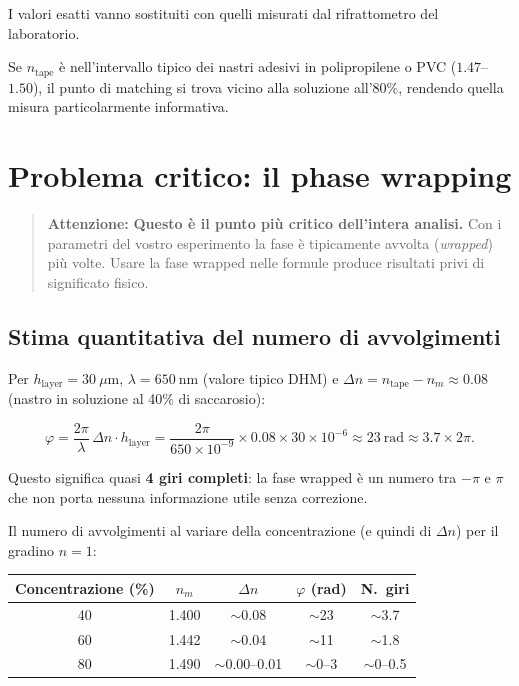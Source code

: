 I valori esatti vanno sostituiti con quelli misurati dal rifrattometro del
laboratorio.

Se $n_\text{tape}$ è nell'intervallo tipico dei nastri adesivi in
polipropilene o PVC ($1.47$--$1.50$), il punto di matching si trova vicino
alla soluzione all'80\%, rendendo quella misura particolarmente informativa.

\section{Problema critico: il phase wrapping}
\label{sec:unwrapping}

\begin{quote}
\textcolor{red!70!black}{\textbf{Attenzione:}} \textbf{Questo è il punto più critico dell'intera analisi.}
Con i parametri del vostro esperimento la fase è tipicamente avvolta
(\textit{wrapped}) più volte. Usare la fase wrapped nelle formule
produce risultati privi di significato fisico.
\end{quote}

\subsection{Stima quantitativa del numero di avvolgimenti}

Per $h_\text{layer} = 30\ \mu\text{m}$, $\lambda = 650\ \text{nm}$ (valore
tipico DHM) e $\Delta n = n_\text{tape} - n_m \approx 0.08$
(nastro in soluzione al 40\% di saccarosio):

\[
  \varphi = \frac{2\pi}{\lambda}\,\Delta n \cdot h_\text{layer}
  = \frac{2\pi}{650 \times 10^{-9}} \times 0.08 \times 30 \times 10^{-6}
  \approx 23\ \text{rad} \approx 3.7 \times 2\pi.
\]

Questo significa quasi \textbf{4 giri completi}: la fase wrapped è un numero
tra $-\pi$ e $\pi$ che non porta nessuna informazione utile senza correzione.

Il numero di avvolgimenti al variare della concentrazione (e quindi di $\Delta n$)
per il gradino $n=1$:

\begin{center}
\begin{tabular}{ccccc}
\hline\hline
Concentrazione (\%) & $n_m$ & $\Delta n$ & $\varphi$ (rad) & N.\ giri \\
\hline
40 & 1.400 & $\sim$0.08 & $\sim$23 & $\sim$3.7 \\
60 & 1.442 & $\sim$0.04 & $\sim$11 & $\sim$1.8 \\
80 & 1.490 & $\sim$0.00--0.01 & $\sim$0--3 & $\sim$0--0.5 \\
\hline\hline
\end{tabular}
\end{center}

